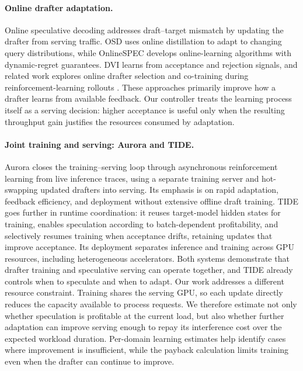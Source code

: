 \documentclass{article}
\begin{document}
\paragraph{Online drafter adaptation.}
Online speculative decoding addresses draft--target mismatch by updating the drafter from serving traffic. OSD \citep{liu2024osd} uses online distillation to adapt to changing query distributions, while OnlineSPEC \citep{qian2026drafts} develops online-learning algorithms with dynamic-regret guarantees. DVI \citep{bhansali2025dvi} learns from acceptance and rejection signals, and related work explores online drafter selection \citep{liu2026notabandit} and co-training during reinforcement-learning rollouts \citep{wang2026cotraining}. These approaches primarily improve how a drafter learns from available feedback. Our controller treats the learning process itself as a serving decision: higher acceptance is useful only when the resulting throughput gain justifies the resources consumed by adaptation.

\paragraph{Joint training and serving: Aurora and TIDE.}
Aurora \citep{wang2026aurora} closes the training--serving loop through asynchronous reinforcement learning from live inference traces, using a separate training server and hot-swapping updated drafters into serving. Its emphasis is on rapid adaptation, feedback efficiency, and deployment without extensive offline draft training. TIDE \citep{park2026tide} goes further in runtime coordination: it reuses target-model hidden states for training, enables speculation according to batch-dependent profitability, and selectively resumes training when acceptance drifts, retaining updates that improve acceptance. Its deployment separates inference and training across GPU resources, including heterogeneous accelerators. Both systems demonstrate that drafter training and speculative serving can operate together, and TIDE already controls when to speculate and when to adapt. Our work addresses a different resource constraint. Training shares the serving GPU, so each update directly reduces the capacity available to process requests. We therefore estimate not only whether speculation is profitable at the current load, but also whether further adaptation can improve serving enough to repay its interference cost over the expected workload duration. Per-domain learning estimates help identify cases where improvement is insufficient, while the payback calculation limits training even when the drafter can continue to improve.
\end{document}
